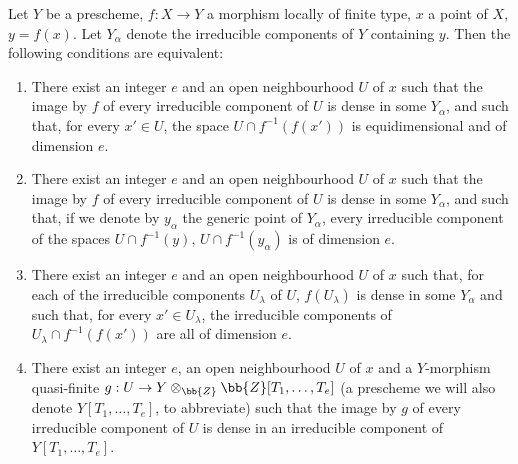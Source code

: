 \begin{proposition}[13.3.1]
\label{IV.13.3.1}
Let $Y$ be a prescheme, $f:X\to Y$ a morphism locally of finite type, $x$ a point of $X$, $y=f(x)$.
Let $Y_\alpha$ denote the irreducible components of $Y$ containing $y$.
Then the following conditions are equivalent:
\begin{enumerate}[label=\emph{\alph*)}]
  \item There exist an integer $e$ and an open neighbourhood $U$ of $x$ such that the image by $f$ of every irreducible component of $U$ is dense in some $Y_\alpha$, and such that, for every $x'\in U$, the space $U\cap f^{-1}(f(x'))$ is equidimensional and of dimension $e$.
  \item[\emph{a$'$)}] There exist an integer $e$ and an open neighbourhood $U$ of $x$ such that the image by $f$ of every irreducible component of $U$ is dense in some $Y_\alpha$, and such that, if we denote by $y_\alpha$ the generic point of $Y_\alpha$, every irreducible component of the spaces $U\cap f^{-1}(y)$, $U\cap f^{-1}(y_\alpha)$ is of dimension $e$.
  \item[\emph{a$''$)}] There exist an integer $e$ and an open neighbourhood $U$ of $x$ such that, for each of the irreducible components $U_\lambda$ of $U$, $f(U_\lambda)$ is dense in some $Y_\alpha$ and such that, for every $x'\in U_\lambda$, the irreducible components of $U_\lambda\cap f^{-1}(f(x'))$ are all of dimension $e$.
  \item There exist an integer $e$, an open neighbourhood $U$ of $x$ and a $Y$-morphism quasi-finite $g:U\to Y\otimes_{\bb{Z}}\bb{Z}[T_1,\ldots,T_e]$ (a prescheme we will also denote $Y[T_1,\ldots,T_e]$, to abbreviate) such that the image by $g$ of every irreducible component of $U$ is dense in an irreducible component of $Y[T_1,\ldots,T_e]$.
\end{enumerate}
\end{proposition}

